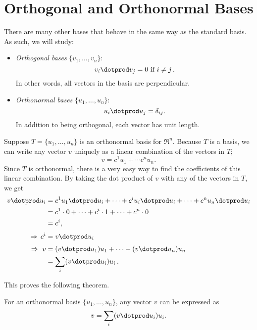 \section{Orthogonal and Orthonormal Bases}

There are many other bases that  behave in the same way as the standard basis.  As such, we will study:
\begin{itemize}
\item \emph{Orthogonal bases} $\{v_1, \ldots, v_n \}$:
\[
v_i\dotprod v_j=0 \text{ if } i\neq j\, .
\]
In other words, all vectors in the basis are perpendicular.

\item \emph{Orthonormal bases} $\{u_1, \ldots, u_n \}$:
\[
u_i\dotprod u_j = \delta_{ij}.
\]
In addition to being orthogonal, each vector has unit length.
\end{itemize}

Suppose $T=\{u_1, \ldots, u_n \}$ is an orthonormal basis for $\Re^n$.  Because $T$ is a basis, we can write any vector $v$ uniquely as a linear combination of the vectors in $T$;
\[
v=c^1u_1+\cdots c^nu_n.
\]
Since $T$ is orthonormal, there is a very easy way to find the coefficients of this linear combination.  By taking the dot product of $v$ with any of the vectors in $T$, we get
\begin{align*}
v\dotprod u_i &= c^1u_1\dotprod u_i + \cdots + c^iu_i\dotprod u_i + \cdots + c^nu_n\dotprod u_i \\
& = c^1\cdot 0 + \cdots + c^i\cdot 1 + \cdots + c^n\cdot 0 \\
& = c^i, \\[1mm]
\Rightarrow\, c^i &= v\dotprod u_i \\[1mm]
\Rightarrow\  v &= (v\dotprod u_1) u_1 + \cdots + (v\dotprod u_n)u_n\\
&= \sum_i (v\dotprod u_i)u_i\, .
\end{align*}

This proves the following theorem.
\begin{theorem}
For an orthonormal basis $\{u_1, \ldots, u_n \}$, any vector $v$ can be expressed as
\[
v =\sum_i (v\dotprod u_i)u_i.
\]
\end{theorem}


